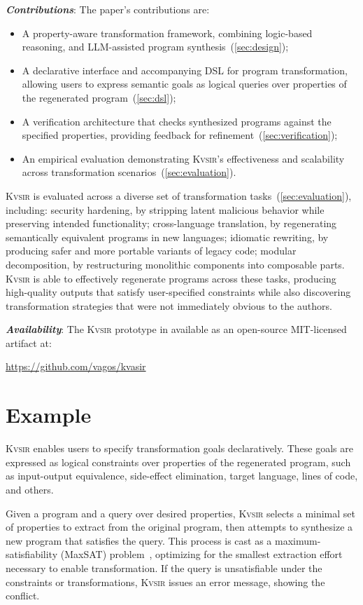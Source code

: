\documentclass[sigplan]{acmart}
\newcommand{\sys}{{\scshape Kv{\textalpha}sir}\xspace}
\newcommand{\heading}[1]{\vspace{2pt}\noindent\textbf{\emph{#1}}:\enspace}
\begin{document}
\heading{Contributions}
The paper's contributions are:
\begin{itemize}
  \item A property-aware transformation framework, combining logic-based reasoning, and LLM-assisted program synthesis~(\cref{sec:design});
 \item A declarative interface and accompanying DSL for program transformation, allowing users to express semantic goals as logical queries over properties of the regenerated program~(\cref{sec:dsl});
 \item A verification architecture that checks synthesized programs against the specified properties, providing feedback for refinement~(\cref{sec:verification});
 \item An empirical evaluation demonstrating \sys's effectiveness and scalability across transformation scenarios~(\cref{sec:evaluation}).
\end{itemize}

\sys is evaluated across a diverse set of transformation tasks~(\cref{sec:evaluation}), including:
	security hardening, by stripping latent malicious behavior while preserving intended functionality;
	cross-language translation, by regenerating semantically equivalent programs in new languages;
	idiomatic rewriting, by producing safer and more portable variants of legacy code;
	modular decomposition, by restructuring monolithic components into composable parts.
\sys is able to effectively regenerate programs across these tasks, producing high-quality outputs that satisfy user-specified constraints while also discovering transformation strategies that were not immediately obvious to the authors.

\heading{Availability}
The \sys prototype in available as an open-source MIT-licensed artifact at:
\begin{center}
  \url{https://github.com/vagos/kvasir}
\end{center}

\section{Example}
\label{sec:example}
\sys enables users to specify transformation goals declaratively.
These goals are expressed as logical constraints over properties of the
regenerated program, such as input-output equivalence, side-effect elimination,
target language, lines of code, and others.

Given a program and a query over desired properties, \sys selects a minimal set
of properties to extract from the original program, then attempts to synthesize
a new program that satisfies the query.
This process is cast as a
maximum-satisfiability (MaxSAT) problem~\cite{sung2006maximum}, optimizing for the smallest extraction
effort necessary to enable transformation.
If the query is unsatisfiable under
the constraints or transformations, \sys issues an error
message, showing the conflict.
\end{document}
